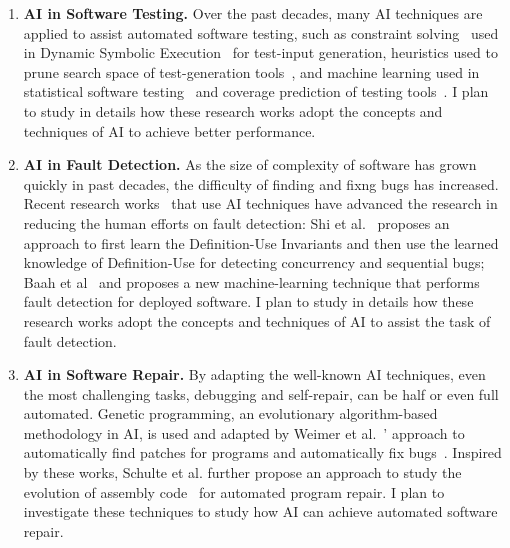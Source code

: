 \documentclass[times, 10pt,onecolumn]{article}
\begin{document}
\begin{enumerate}
\item{\textbf{AI in Software Testing.} Over the past decades, many AI techniques are applied to assist automated software testing, such as constraint solving~\cite{constraintsolving} used in Dynamic Symbolic Execution~\cite{symbolic, dart, cute} for test-input generation, heuristics used to prune search space of test-generation tools~\cite{prune,fitness}, and machine learning used in statistical software testing~\cite{mlinstatistics} and coverage prediction of testing tools~\cite{predictCoverage}. I plan to study in details how these research works adopt the concepts and techniques of AI to achieve better performance.}

\item{\textbf{AI in Fault Detection.} As the size of complexity of software has grown quickly in past decades, the difficulty of finding and fixng bugs has increased. Recent research works~\cite{wrongDefinition,online} that use AI techniques have advanced the research in reducing the human efforts on fault detection: Shi et al.~\cite{wrongDefinition} proposes an approach to first learn the Definition-Use Invariants and then use the learned knowledge of Definition-Use for detecting concurrency and sequential bugs; Baah et al~\cite{online} and proposes a new machine-learning technique that performs fault detection for deployed software. I plan to study in details how these research works adopt the concepts and techniques of AI to assist the task of fault detection.}


\item{\textbf{AI in Software Repair.} By adapting the well-known AI techniques, even the most challenging tasks, debugging and self-repair, can be half or even full automated. Genetic programming, an evolutionary algorithm-based methodology in AI, is used and adapted by Weimer et al.~\cite{geneticPatch}' approach to automatically find patches for programs and automatically fix bugs~\cite{repair}. Inspired by these works, Schulte et al. further propose an approach to study the evolution of assembly code~\cite{evolutionaryComputation} for automated program repair. I plan to investigate these techniques to study how AI can achieve automated software repair.
}
\end{enumerate}



\end{document}
